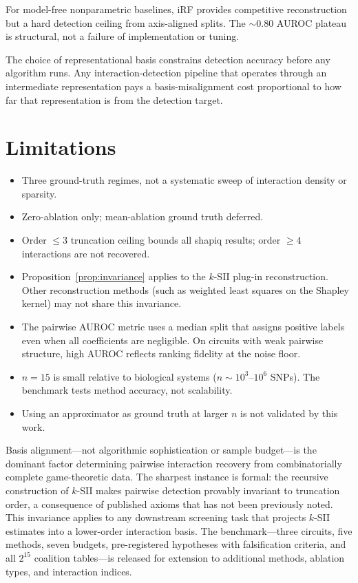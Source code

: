 \documentclass[10pt]{article}
\begin{document}
For model-free nonparametric baselines, iRF provides competitive
reconstruction but a hard detection ceiling from axis-aligned
splits. The $\sim$0.80 AUROC plateau is structural, not a failure
of implementation or tuning.

The choice of representational basis constrains detection accuracy
before any algorithm runs. Any interaction-detection pipeline that
operates through an intermediate representation pays a
basis-misalignment cost proportional to how far that
representation is from the detection target.


\section{Limitations}
\label{sec:limitations}

\begin{itemize}
\item Three ground-truth regimes, not a systematic sweep of
      interaction density or sparsity.
\item Zero-ablation only; mean-ablation ground truth deferred.
\item Order $\leq 3$ truncation ceiling bounds all shapiq results;
      order $\geq 4$ interactions are not recovered.
\item Proposition~\ref{prop:invariance} applies to the $k$-SII
      plug-in reconstruction. Other reconstruction methods (such as
      weighted least squares on the Shapley kernel) may not share
      this invariance.
\item The pairwise AUROC metric uses a median split that assigns
      positive labels even when all coefficients are negligible.
      On circuits with weak pairwise structure, high AUROC reflects
      ranking fidelity at the noise floor.
\item $n = 15$ is small relative to biological systems
      ($n \sim 10^3$--$10^6$ SNPs). The benchmark tests method
      accuracy, not scalability.
\item Using an approximator as ground truth at larger $n$ is not
      validated by this work.
\end{itemize}


Basis alignment---not algorithmic sophistication or sample
budget---is the dominant factor determining pairwise interaction
recovery from combinatorially complete game-theoretic data.
The sharpest instance is formal: the recursive construction of
$k$-SII makes pairwise detection provably invariant to truncation
order, a consequence of published axioms that has not been
previously noted. This invariance applies to any downstream
screening task that projects $k$-SII estimates into a lower-order
interaction basis. The benchmark---three circuits, five methods,
seven budgets, pre-registered hypotheses with falsification
criteria, and all $2^{15}$ coalition tables---is released for
extension to additional methods, ablation types, and interaction
indices.





\end{document}
